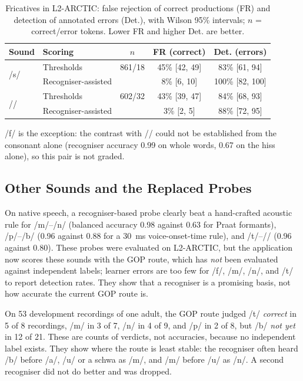 \documentclass[engproc,article,submit,moreauthors]{Definitions/mdpi}
\newcommand{\ipa}[1]{/#1/}
\begin{document}
\begin{table}[!t]
\caption{Fricatives in L2-ARCTIC: false rejection of correct productions (FR) and detection of annotated errors (Det.), with Wilson 95\% intervals; $n$ = correct/error tokens. Lower FR and higher Det. are better.\label{tab:l2}}
\small
\begin{tabularx}{\textwidth}{llccc}
\toprule
\textbf{Sound} & \textbf{Scoring} & \textbf{$n$} & \textbf{FR (correct)} & \textbf{Det. (errors)}\\
\midrule
\multirow{2}{*}{\ipa{s}} & Thresholds & 861/18 & 45\% [42, 49] & 83\% [61, 94]\\
 & Recogniser-assisted & & 8\% [6, 10] & 100\% [82, 100]\\
\multirow{2}{*}{\ipa{\textesh}} & Thresholds & 602/32 & 43\% [39, 47] & 84\% [68, 93]\\
 & Recogniser-assisted & & 3\% [2, 5] & 88\% [72, 95]\\
\bottomrule
\end{tabularx}
\end{table}

\ipa{f} is the exception: the contrast with \ipa{\texttheta} could not be established from the consonant alone (recogniser accuracy 0.99 on whole words, 0.67 on the hiss alone), so this pair is not graded.

\subsection{Other Sounds and the Replaced Probes}
On native speech, a recogniser-based probe clearly beat a hand-crafted acoustic rule for \ipa{m}--\ipa{n} (balanced accuracy 0.98 against 0.63 for Praat formants), \ipa{p}--\ipa{b} (0.96 against 0.88 for a 30~ms voice-onset-time rule), and \ipa{t\textesh}--\ipa{\textesh} (0.96 against 0.80). These probes were evaluated on L2-ARCTIC, but the application now scores these sounds with the GOP route, which has \emph{not} been evaluated against independent labels; learner errors are too few for \ipa{f}, \ipa{m}, \ipa{n}, and \ipa{t\textesh} to report detection rates. They show that a recogniser is a promising basis, not how accurate the current GOP route is.

On 53 development recordings of one adult, the GOP route judged \ipa{t\textesh} \textit{correct} in 5 of 8 recordings, \ipa{m} in 3 of 7, \ipa{n} in 4 of 9, and \ipa{p} in 2 of 8, but \ipa{b} \textit{not yet} in 12 of 21. These are counts of verdicts, not accuracies, because no independent label exists. They show where the route is least stable: the recogniser often heard \ipa{b} before \ipa{a}, \ipa{u} or a schwa as \ipa{m}, and \ipa{m} before \ipa{u} as \ipa{n}. A second recogniser did not do better and was dropped.
\end{document}
